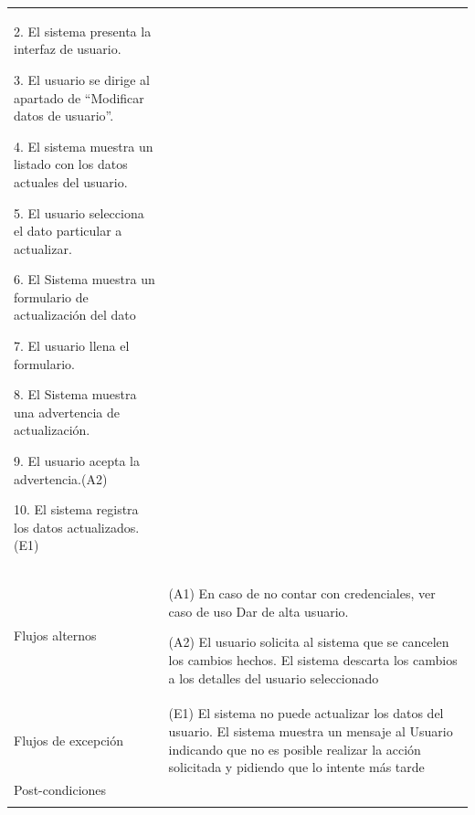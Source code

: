 \begin{longtable}{@{\extracolsep{8pt}}l p{8.5cm}}
 2. El sistema presenta la interfaz de usuario. \par\vspace{.1cm}

 3. El usuario se dirige al apartado de “Modificar datos de usuario”. \par\vspace{.1cm}

 4. El sistema muestra un listado con los datos actuales del usuario. \par\vspace{.1cm}

 5. El usuario selecciona el dato particular a actualizar. \par\vspace{.1cm}

 6. El Sistema muestra un formulario de actualización del dato \par\vspace{.1cm}

 7. El usuario llena el formulario. \par\vspace{.1cm}

 8. El Sistema muestra una advertencia de actualización. \par\vspace{.1cm}

 9. El usuario acepta la advertencia.(A2) \par\vspace{.1cm}

 10. El sistema registra los datos actualizados.(E1) \par\vspace{.1cm}

\\

\hspace{.2cm}Flujos alternos &
\par (A1) En caso de no contar con credenciales, ver caso de uso Dar de alta usuario.

\par (A2) El usuario solicita al sistema que se cancelen los cambios hechos. El sistema descarta los cambios a los detalles del usuario seleccionado

\par



\\

\hspace{.2cm}Flujos de excepción &
\par\vspace{.1cm} (E1) El sistema no puede actualizar los datos del usuario. El sistema muestra un mensaje al Usuario indicando que no es posible realizar la acción solicitada y pidiendo que lo intente más tarde


\\%

\hspace{.2cm}Post-condiciones &
\\
\hline

 \\
\end{longtable}
